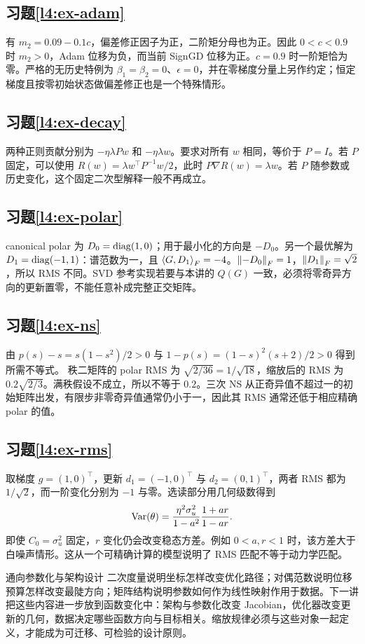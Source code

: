 \subsection*{习题\ref{l4:ex-adam}}
有 $m_2=0.09-0.1c$，偏差修正因子为正，二阶矩分母也为正。因此 $0<c<0.9$ 时 $m_2>0$，Adam 位移为负，而当前 SignGD 位移为正。$c=0.9$ 时一阶矩恰为零。严格的无历史特例为 $\beta_1=\beta_2=0$、$\epsilon=0$，并在零梯度分量上另作约定；恒定梯度且按零初始状态做偏差修正也是一个特殊情形。

\subsection*{习题\ref{l4:ex-decay}}
两种正则贡献分别为 $-\eta\lambda Pw$ 和 $-\eta\lambda w$。要求对所有 $w$ 相同，等价于 $P=I$。若 $P$ 固定，可以使用
$R(w)=\lambda w^\top P^{-1}w/2$，此时 $P\nabla R(w)=\lambda w$。若 $P$ 随参数或历史变化，这个固定二次型解释一般不再成立。

\subsection*{习题\ref{l4:ex-polar}}
canonical polar 为 $D_0=\operatorname{diag}(1,0)$；用于最小化的方向是 $-D_0$。另一个最优解为 $D_1=\operatorname{diag}(-1,1)$：谱范数为一，且 $\left\langle G,D_1\right\rangle_F=-4$。$\left\lVert-D_0\right\rVert_F=1$，$\left\lVert D_1\right\rVert_F=\sqrt2$，所以 RMS 不同。SVD 参考实现若要与本讲的 $Q(G)$ 一致，必须将零奇异方向的更新置零，不能任意补成完整正交矩阵。

\subsection*{习题\ref{l4:ex-ns}}
由 $p(s)-s=s(1-s^2)/2>0$ 与
$1-p(s)=(1-s)^2(s+2)/2>0$ 得到所需不等式。
秩二矩阵的 polar RMS 为 $\sqrt{2/36}=1/\sqrt{18}$，缩放后的 RMS 为
$0.2\sqrt{2/3}$。满秩假设不成立，所以不等于 $0.2$。三次 NS 从正奇异值不超过一的初始矩阵出发，有限步非零奇异值通常仍小于一，因此其 RMS 通常还低于相应精确 polar 的值。

\subsection*{习题\ref{l4:ex-rms}}
取梯度 $g=(1,0)^\top$，更新 $d_1=(-1,0)^\top$ 与 $d_2=(0,1)^\top$，两者 RMS 都为 $1/\sqrt2$，而一阶变化分别为 $-1$ 与零。选读部分用几何级数得到
\[
 \operatorname{Var}(\theta)=\frac{\eta^2\sigma_u^2}{1-a^2}
 \frac{1+ar}{1-ar}.
\]
即使 $C_0=\sigma_u^2$ 固定，$r$ 变化仍会改变稳态方差。例如 $0<a,r<1$ 时，该方差大于白噪声情形。这从一个可精确计算的模型说明了 RMS 匹配不等于动力学匹配。

\begin{coursebox}{通向参数化与架构设计}
二次度量说明坐标怎样改变优化路径；对偶范数说明位移预算怎样改变最陡方向；矩阵结构说明参数如何作为线性映射作用于数据。下一讲把这些内容进一步放到函数变化中：架构与参数化改变 Jacobian，优化器改变更新的几何，数据决定哪些函数方向与目标相关。缩放规律必须与这些对象一起定义，才能成为可迁移、可检验的设计原则。
\end{coursebox}
